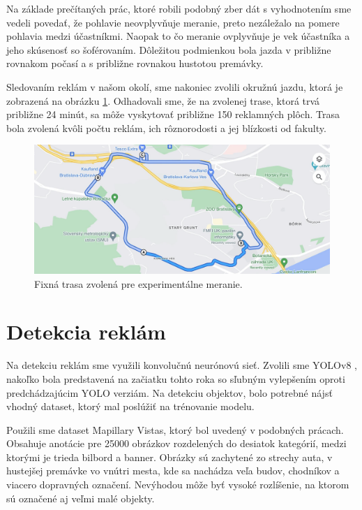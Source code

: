 Na základe prečítaných prác, ktoré robili podobný zber dát s vyhodnotením sme vedeli povedať, že pohlavie neovplyvňuje meranie, preto nezáležalo na pomere pohlavia medzi účastníkmi. Naopak to čo meranie ovplyvňuje je vek účastníka a jeho skúsenosť so šoférovaním. Dôležitou podmienkou bola jazda v približne rovnakom počasí a s približne rovnakou hustotou premávky. 

Sledovaním reklám v našom okolí, sme nakoniec zvolili okružnú jazdu, ktorá je zobrazená na obrázku \ref{img:road}. Odhadovali sme, že na zvolenej trase, ktorá trvá približne 24 minút, sa môže vyskytovať približne 150 reklamných plôch. Trasa bola zvolená kvôli počtu reklám, ich rôznorodosti a jej blízkosti od fakulty.
\\
\begin{figure}[ht]
    \centering
    \includegraphics[width=1\textwidth]{images/02/map.png}
    \caption{Fixná trasa zvolená pre experimentálne meranie.}
    \label{img:road}
\end{figure}

\section{Detekcia reklám}

Na detekciu reklám sme využili konvolučnú neurónovú sieť. Zvolili sme YOLOv8 \cite{yolov8}, nakoľko bola predstavená na začiatku tohto roka so sľubným vylepšením oproti predchádzajúcim YOLO verziám. Na detekciu objektov, bolo potrebné nájsť vhodný dataset, ktorý mal poslúžiť na trénovanie modelu.

Použili sme dataset Mapillary Vistas, ktorý bol uvedený v podobných prácach. Obsahuje anotácie pre 25000 obrázkov rozdelených do desiatok kategórií, medzi ktorými je trieda bilbord a banner. Obrázky sú zachytené zo strechy auta, v hustejšej premávke vo vnútri mesta, kde sa nachádza veľa budov, chodníkov a viacero dopravných označení. Nevýhodou môže byť vysoké rozlíšenie, na ktorom sú označené aj veľmi malé objekty.

